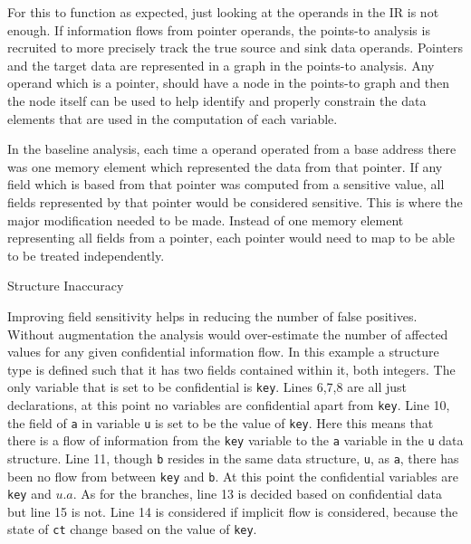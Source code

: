 \documentclass[11pt,a4paper]{article}
\begin{document}
  
  For this to function as expected, just looking at the operands in the IR is
  not enough. If information flows from pointer operands, the points-to analysis
  is recruited to more precisely track the true source and sink data operands.
  Pointers and the target data are represented in a graph in the points-to
  analysis. Any operand which is a pointer, should have a node in the points-to
  graph and then the node itself can be used to help identify and properly
  constrain the data elements that are used in the computation of each variable.

  In the baseline analysis, each time a operand operated from a base address
  there was one memory element which represented the data from that pointer. If
  any field which is based from that pointer was computed from a sensitive
  value, all fields represented by that pointer would be considered sensitive.
  This is where the major modification needed to be made. Instead of one memory
  element representing all fields from a pointer, each pointer would need to map
  to be able to be treated independently.

\begin{algorithm}

\caption{Structure Inaccuracy}
\label{alg:inacc}
\end{algorithm}

  Improving field sensitivity helps in reducing the number of false positives.
  Without augmentation the analysis would over-estimate the number of affected
  values for any given confidential information flow. In this example a
  structure type is defined such that it has two fields contained within it,
  both integers. The only variable that is set to be confidential is
  \texttt{key}. Lines 6,7,8 are all just declarations, at this point no
  variables are confidential apart from \texttt{key}. Line 10, the field of
  \texttt{a} in variable \texttt{u} is set to be the value of \texttt{key}. Here
  this means that there is a flow of information from the \texttt{key} variable
  to the \texttt{a} variable in the \texttt{u} data structure. Line 11, though
  \texttt{b} resides in the same data structure, \texttt{u}, as \texttt{a},
  there has been no flow from between \texttt{key} and \texttt{b}. At this point
  the confidential variables are \texttt{key} and $u.a$. As for the branches,
  line 13 is decided based on confidential data but line 15 is not. Line 14 is
  considered if implicit flow is considered, because the state of \texttt{ct}
  change based on the value of \texttt{key}.
\end{document}
